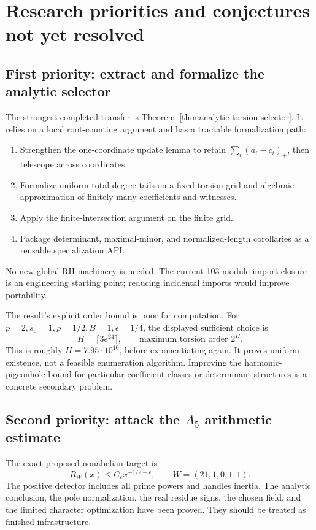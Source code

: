 \section{Research priorities and conjectures not yet resolved}
\label{sec:priorities}

\subsection{First priority: extract and formalize the analytic selector}

The strongest completed transfer is Theorem~\ref{thm:analytic-torsion-selector}.
It relies on a local root-counting argument and has a tractable
formalization path:
\begin{enumerate}
\item Strengthen the one-coordinate update lemma to retain
\(\sum_i(a_i-c_i)_+\), then telescope across coordinates.
\item Formalize uniform total-degree tails on a fixed torsion grid and
algebraic approximation of finitely many coefficients and witnesses.
\item Apply the finite-intersection argument on the finite grid.
\item Package determinant, maximal-minor, and normalized-length corollaries
as a reusable specialization API.
\end{enumerate}
No new global RH machinery is needed. The current 103-module import
closure is an engineering starting point; reducing incidental imports
would improve portability.

The result's explicit order bound is poor for computation. For
\(p=2,s_0=1,\rho=1/2,B=1,\epsilon=1/4\), the displayed sufficient
choice is
\[
 H=\lceil3e^{24}\rceil,\qquad \text{maximum torsion order }2^H.
\]
This is roughly \(H=7.95\cdot10^{10}\), before exponentiating again.
It proves uniform existence, not a feasible enumeration algorithm.
Improving the harmonic-pigeonhole bound for particular coefficient
classes or determinant structures is a concrete secondary problem.

\subsection{Second priority: attack the \texorpdfstring{\(A_5\)}{A5} arithmetic estimate}

The exact proposed nonabelian target is
\[
 R_W(x)\le C_\epsilon x^{-1/2+\epsilon},
 \qquad W=(21,1,0,1,1).
\]
The positive detector includes all prime powers and handles inertia.
The analytic conclusion, the pole normalization, the real residue signs,
the chosen field, and the limited character optimization have been proved.
They should be treated as finished infrastructure.


